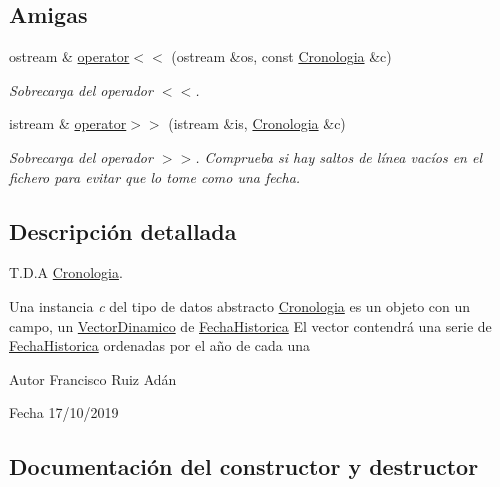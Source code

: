 \subsection*{Amigas}
\begin{DoxyCompactItemize}
\item 
ostream \& \hyperlink{classCronologia_a5a590e2ec95cc4489c3de5b03e2cac4c}{operator$<$$<$} (ostream \&os, const \hyperlink{classCronologia}{Cronologia} \&c)
\begin{DoxyCompactList}\small\item\em Sobrecarga del operador $<$$<$. \end{DoxyCompactList}\item 
istream \& \hyperlink{classCronologia_a6fa0f1131309b1cee355b9d8297ea33d}{operator$>$$>$} (istream \&is, \hyperlink{classCronologia}{Cronologia} \&c)
\begin{DoxyCompactList}\small\item\em Sobrecarga del operador $>$$>$. Comprueba si hay saltos de línea vacíos en el fichero para evitar que lo tome como una fecha. \end{DoxyCompactList}\end{DoxyCompactItemize}


\subsection{Descripción detallada}
T.\+D.\+A \hyperlink{classCronologia}{Cronologia}. 

Una instancia {\itshape c} del tipo de datos abstracto {\ttfamily \hyperlink{classCronologia}{Cronologia}} es un objeto con un campo, un {\ttfamily \hyperlink{classVectorDinamico}{Vector\+Dinamico}} de {\ttfamily \hyperlink{classFechaHistorica}{Fecha\+Historica}} El vector contendrá una serie de {\ttfamily \hyperlink{classFechaHistorica}{Fecha\+Historica}} ordenadas por el año de cada una

\begin{DoxyAuthor}{Autor}
Francisco Ruiz Adán 
\end{DoxyAuthor}
\begin{DoxyDate}{Fecha}
17/10/2019 
\end{DoxyDate}


\subsection{Documentación del constructor y destructor}
\mbox{\label{classCronologia_ac0026b1919148f6cd6cf4ca4c357771e}} 
